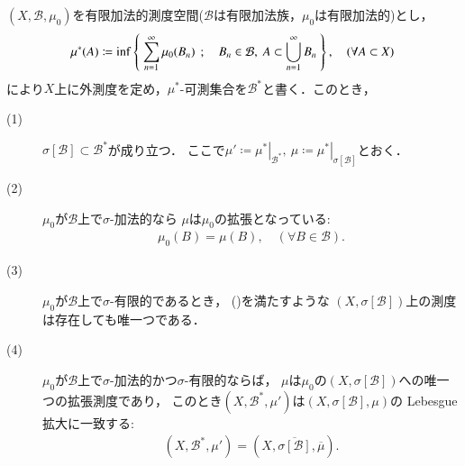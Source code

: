 		\begin{screen}
			\begin{thm}
				$(X,\mathcal{B},\mu_0)$を有限加法的測度空間($\mathcal{B}$は有限加法族，$\mu_0$は有限加法的)とし，
				\begin{align}
					\mu^*(A) \coloneqq \operatorname*{inf}_{} \left\{\ \sum_{n=1}^\infty \mu_0(B_n)\ \, ; \quad B_n \in \mathcal{B},\ A \subset \bigcup_{n=1}^\infty B_n\ \right\},
					\quad (\forall A \subset X)
				\end{align}
				により$X$上に外測度を定め，$\mu^*$-可測集合を$\mathcal{B}^*$と書く．このとき，
				\begin{description}
					\item[(1)] $\sigma[\mathcal{B}] \subset \mathcal{B}^*$が成り立つ．
						ここで$\mu' \coloneqq\left.\mu^*\right|_{\mathcal{B}^*},
						\ \mu \coloneqq \left.\mu^*\right|_{\sigma[\mathcal{B}]}$とおく．
					\item[(2)] $\mu_0$が$\mathcal{B}$上で$\sigma$-加法的なら
						$\mu$は$\mu_0$の拡張となっている:
						\begin{align}
							\mu_0(B) = \mu(B),\quad (\forall B \in \mathcal{B}).
							\label{eq:appendix_finite_additive_measure_expansion_1}
						\end{align}
						
					\item[(3)] $\mu_0$が$\mathcal{B}$上で$\sigma$-有限的であるとき，
						()を満たすような
						$\left( X,\sigma[\mathcal{B}] \right)$上の測度は存在しても唯一つである．
					
					\item[(4)] $\mu_0$が$\mathcal{B}$上で$\sigma$-加法的かつ$\sigma$-有限的ならば，
						$\mu$は$\mu_0$の$\left( X,\sigma[\mathcal{B}] \right)$への唯一つの拡張測度であり，
						このとき$\left( X,\mathcal{B}^*,\mu' \right)$は$(X,\sigma[\mathcal{B}],\mu)$の
						Lebesgue拡大に一致する:
						\begin{align}
							\left( X,\mathcal{B}^*,\mu' \right) 
							= \left( X,\overline{\sigma[\mathcal{B}]},\overline{\mu} \right).
							\label{eq:appendix_finite_additive_measure_expansion_5}
						\end{align}
				\end{description}
			\end{thm}
		\end{screen}
		
